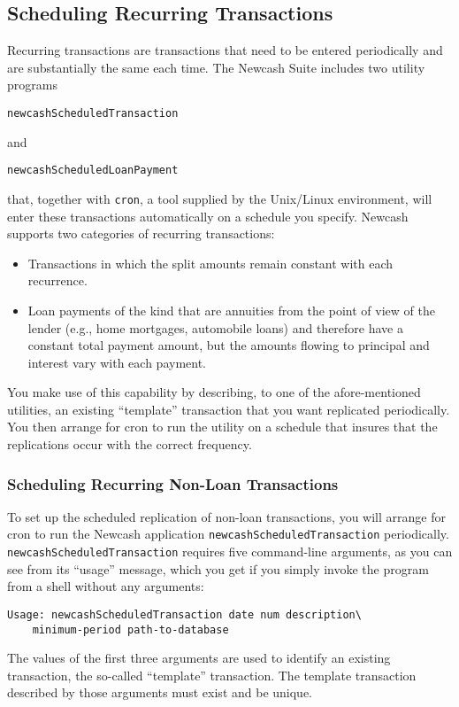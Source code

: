 \documentclass{report}
\begin{document}
\subsection{Scheduling Recurring Transactions}
Recurring transactions are transactions that need to be entered periodically and are substantially the same each time. The Newcash Suite includes two utility programs
\begin{verbatim}
newcashScheduledTransaction
\end{verbatim}
and
\begin{verbatim}
newcashScheduledLoanPayment
\end{verbatim}
that, together with \verb|cron|, a tool supplied by the Unix/Linux environment, will enter these transactions automatically on a schedule you specify. Newcash supports two categories of recurring transactions:
\begin{itemize}
\item  Transactions in which the split amounts remain constant with each recurrence.
\item  Loan payments of the kind that are annuities from the point of view of the lender (e.g., home mortgages, automobile loans) and therefore have a constant total payment amount, but the amounts flowing to principal and interest vary with each payment.
\end{itemize}
You make use of this capability by describing, to one of the afore-mentioned utilities, an existing ``template'' transaction that you want replicated periodically. You then arrange for cron to run the utility on a schedule that insures that the replications occur with the correct frequency.

\subsubsection{Scheduling Recurring Non-Loan Transactions}
To set up the scheduled replication of non-loan transactions, you will arrange for cron to run the Newcash application \verb|newcashScheduledTransaction| periodically.
\verb|newcashScheduledTransaction| requires five command-line arguments, as you can see from its ``usage'' message, which you get if you simply invoke the program from a shell without any arguments:
\begin{verbatim}
Usage: newcashScheduledTransaction date num description\
    minimum-period path-to-database
\end{verbatim}

The values of the first three arguments are used to identify an existing transaction, the so-called ``template'' transaction. The template transaction described by those arguments must exist and be unique.
\end{document}
